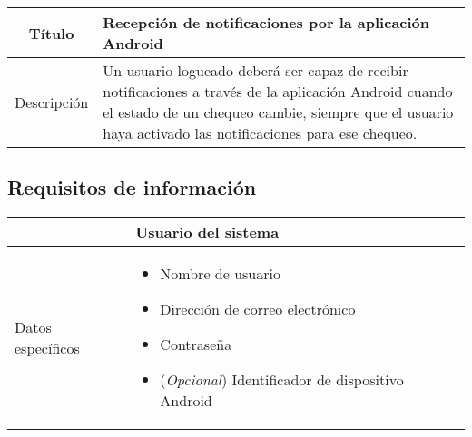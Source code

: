 \begin{center}
  
  \begin{tabularx}{\textwidth}{|c|X|}
    \hline
    Título & Recepción de notificaciones por la aplicación Android \\

    \hline

    Descripción & Un usuario logueado deberá ser capaz de recibir notificaciones
    a través de la aplicación Android cuando el estado de un chequeo cambie,
    siempre que el usuario haya activado las notificaciones para ese
    chequeo. \\

    \hline
  \end{tabularx}
\end{center}

\FloatBarrier
\subsection{Requisitos de información}
\label{sec:requisitos-informacion}


\begin{center}
  
  \begin{tabularx}{\textwidth}{|l|X|}
    \hline

    & Usuario del sistema\\

    \hline
    Datos específicos &

    \begin{itemize}
    \item Nombre de usuario
    \item Dirección de correo electrónico
    \item Contraseña
    \item (\textit{Opcional}) Identificador de dispositivo Android
    \end{itemize}
    \\
    
    \hline
    
  \end{tabularx}
\end{center}


